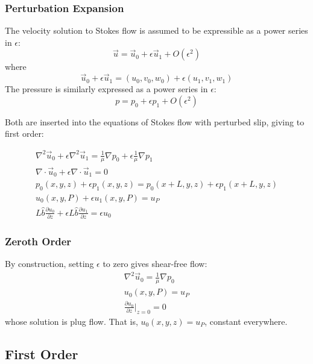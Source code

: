 \documentclass[12pt, a4paper, twoside, openright]{book}
\begin{document}
\subsubsection*{Perturbation Expansion}

The velocity solution to Stokes flow is assumed to be expressible as a power series in $\epsilon$:
\begin{equation}
\vec{u} = \vec{u}_0 + \epsilon \vec{u}_1 + O(\epsilon^2)
\end{equation}
where
\begin{equation}
\vec{u}_0 + \epsilon \vec{u}_1 = (u_0, v_0, w_0) + \epsilon(u_1, v_1, w_1)
\end{equation}
The pressure is similarly expressed as a power series in $\epsilon$:
\begin{equation}
p = p_0 + \epsilon p_1 + O(\epsilon^2)
\end{equation}

Both are inserted into the equations of Stokes flow with perturbed slip, giving to first order:

\begin{gather}
\nabla^2 \vec{u}_0 + \epsilon \nabla^2 \vec{u}_1 =
 \frac{1}{\mu} \nabla p_0 + \epsilon \frac{1}{\mu} \nabla p_1 \\
\nabla \cdot \vec{u}_0 + \epsilon \nabla \cdot \vec{u}_1 = 0  \\
p_0(x,y,z) + \epsilon p_1(x,y,z) = p_0(x+L,y,z) + \epsilon p_1(x+L,y,z) \\
u_0(x,y,P) + \epsilon u_1(x,y,P) = u_P \\ 
 L \hat{b} \frac{\partial u_0}{\partial z}  +
  \epsilon  L \hat{b} \frac{\partial u_1}{\partial z}
= \epsilon u_0
\end{gather}


\subsubsection*{Zeroth Order}

By construction, setting $\epsilon$ to zero gives shear-free flow:
\begin{gather}
\nabla^2 \vec{u}_0  = \frac{1}{\mu} \nabla p_0 \\
u_0(x,y,P) = u_P \\ 
\frac{\partial u_0}{\partial z} \rvert_{z=0} = 0
\end{gather}
whose solution is plug flow.  That is, $u_0(x,y,z) = u_P$, constant everywhere.

\subsection*{First Order}
\end{document}
